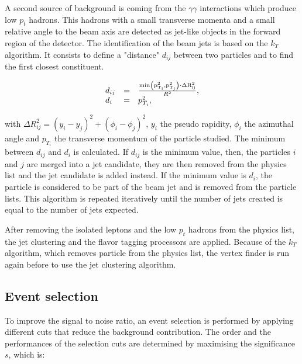     A second source of background is coming from the $\gamma \gamma$ interactions which produce low $p_{t}$ hadrons.
    This hadrons with a small transverse momenta and a small relative angle to the beam axis are detected as jet-like objects in the forward region of the detector.
    The identification of the beam jets is based on the $k_{T}$ algorithm\cite{Cacciari2008}.
    It consists to define a "distance" $d_{ij}$ between two particles and to find the first closest constituent.
    
    \begin{equation}
      \begin{array}{lcl}
        d_{ij} & = & \frac{\rm{min}\left(p^2_{T_i}, p^2_{T_j}\right) \cdot \Delta R^2_{ij}}{R^2}, \\
        d_{i}  & = & p^2_{T_i},
      \end{array}
    \end{equation}

    with $\Delta R^2_{ij} = \left( y_{i} - y_{j}\right)^2 + \left( \phi_{i} - \phi_{j}\right)^2$, $y_{i}$ the pseudo rapidity, $\phi_{i}$ the azimuthal angle and $p_{T_i}$ the transverse momentum of the particle studied.
    The minimum between $d_{ij}$ and $d_{i}$ is calculated.
    If $d_{ij}$ is the minimum value, then, the particles $i$ and $j$ are merged into a jet candidate, they are then removed from the physics list and the jet candidate is added instead.
    If the minimum value is $d_{i}$, the particle is considered to be part of the beam jet and is removed from the particle lists.
    This algorithm is repeated iteratively until the number of jets created is equal to the number of jets expected.
   
    After removing the isolated leptons and the low $p_{t}$ hadrons from the physics list, the jet clustering and the flavor tagging processors are applied. 
    Because of the $k_{T}$ algorithm, which removes particle from the physics list, the vertex finder is run again before to use the jet clustering algorithm.

  \subsection{Event selection}

  To improve the signal to noise ratio, an event selection is performed by applying different cuts that reduce the background contribution.
  The order and the performances of the selection cuts are determined by maximising the significance $s$, which is:


